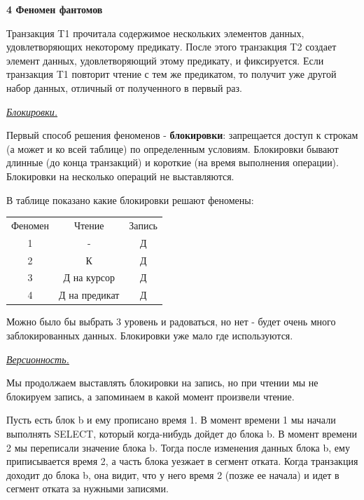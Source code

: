\textbf{4 Феномен фантомов}

Транзакция T1 прочитала содержимое нескольких элементов данных, удовлетворяющих некоторому предикату. После этого транзакция T2 создает элемент данных, удовлетворяющий этому предикату, и фиксируется. Если транзакция T1 повторит чтение с тем же предикатом, то получит уже другой набор данных, отличный от полученного в первый раз.

\begin{center}
\textit{\underline{Блокировки.}}
\end{center}

Первый способ решения феноменов - \textbf{блокировки}: запрещается доступ к строкам (а может и ко всей таблице) по определенным условиям. Блокировки бывают длинные (до конца транзакций) и короткие (на время выполнения операции). Блокировки на несколько операций не выставляются. 

В таблице показано какие блокировки решают феномены:

\begin{center}
	\begin{tabular}{c|c c}
		Феномен & Чтение & Запись \\
		1 & - & Д \\
		2 & К & Д\\
		3 & Д на курсор & Д \\
		4 & Д на предикат & Д\\
	\end{tabular}
\end{center}

Можно было бы выбрать 3 уровень и радоваться, но нет - будет очень много заблокированных данных. Блокировки уже мало где используются. 

\begin{center}
\textit{\underline{Версионность.}}
\end{center}

Мы продолжаем выставлять блокировки на запись, но при чтении мы не блокируем запись, а запоминаем в какой момент произвели чтение. 

Пусть есть блок b и ему прописано время 1. В момент времени 1 мы начали выполнять SELECT, который когда-нибудь дойдет до блока b. В момент времени 2 мы переписали значение блока b. Тогда после изменения данных блока b, ему приписывается время 2, а часть блока уезжает в сегмент отката. Когда транзакция доходит до блока b, она видит, что у него время 2 (позже ее начала) и идет в сегмент отката за нужными записями. 

